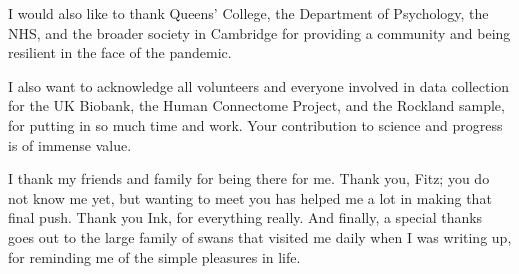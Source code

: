 I would also like to thank Queens' College, the Department of Psychology, the NHS, and the broader society in Cambridge for providing a community and being resilient in the face of the pandemic.

I also want to acknowledge all volunteers and everyone involved in data collection for the UK Biobank, the Human Connectome Project, and the Rockland sample, for putting in so much time and work.
Your contribution to science and progress is of immense value.

I thank my friends and family for being there for me.
Thank you, Fitz; you do not know me yet, but wanting to meet you has helped me a lot in making that final push.
Thank you Ink, for everything really.
And finally, a special thanks goes out to the large family of swans that visited me daily when I was writing up, for reminding me of the simple pleasures in life.
